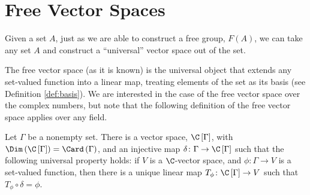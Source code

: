 \section{Free Vector Spaces}%
Given a set $A$, just as we are able to construct a free group, $F(A)$, we can take any set $A$ and construct a ``universal'' vector space out of the set.\newline

The free vector space (as it is known) is the universal object that extends any set-valued function into a linear map, treating elements of the set as its basis (see Definition \ref{def:basis}). We are interested in the case of the free vector space over the complex numbers, but note that the following definition of the free vector space applies over any field. 
\begin{theorem}\label{thm:free_vector_space}
  Let $\Gamma$ be a nonempty set. There is a vector space, $\C\left[\Gamma\right]$, with $\Dim\left(\C\left[\Gamma\right]\right) = \Card\left(\Gamma\right)$, and an injective map $\delta\colon \Gamma\rightarrow \C\left[\Gamma\right]$ such that the following universal property holds: if $V$ is a $\C$-vector space, and $\phi\colon \Gamma\rightarrow V$ is a set-valued function, then there is a unique linear map $T_{\phi}\colon \C\left[\Gamma\right]\rightarrow V$ such that $T_{\phi}\circ \delta = \phi$.
  \begin{center}
  \end{center}
\end{theorem}
